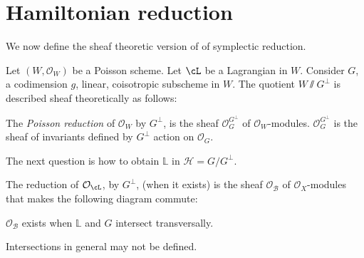     \section{Hamiltonian reduction}
    We now define the sheaf theoretic version of of symplectic reduction.  
    
    Let \((W,\mathcal{O}_W)\) be a Poisson scheme. Let \( \cL\) be a Lagrangian in \(W\). Consider \(G\), a codimension \(g\), linear, coisotropic subscheme in \(W\).
    The quotient \(W \sslash G^{\perp} \) is described sheaf theoretically as follows:
    \begin{defn}
    The \emph{Poisson reduction} of \( \mathcal{O}_W\) by \(G^{\perp}\), is the sheaf \( \mathcal{O}_G^{G^{\perp}}\) of \( \mathcal{O}_W\)-modules. \( \mathcal{O}_G^{G^{\perp}}\) is the sheaf of invariants defined by \(G^{\perp}\) action on \( \mathcal{O}_G\).
    \end{defn}
    
    The next question is how to obtain \( \mathbb{L}\) in \( \mathcal{H} = G/G^{\perp}\).
    
    \begin{defn}
    The reduction of \( \mathcal{O}_{\cL} \), by \( G^{\perp}\), (when it exists) is the sheaf \( \mathcal{O}_\mathcal{B}\) of \( \mathcal{O}_X\)-modules that makes the following diagram commute:
    \begin{center}
    \end{center}
    \end{defn}
    
    \begin{lem} \( \mathcal{O}_{\mathcal{B}}\) exists when \( \mathbb{L}\) and \(G\) intersect transversally. 
    \end{lem}
    
    \begin{rem}Intersections in general may not be defined.
    \end{rem}
    

